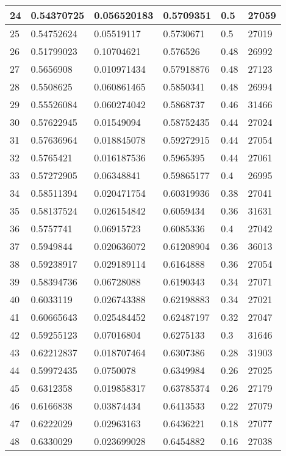 \begin{longtable}{|l|l|l|l|l|l|}
24 & 0.54370725 & 0.056520183 & 0.5709351 & 0.5 & 27059 \\ \hline 
25 & 0.54752624 & 0.05519117 & 0.5730671 & 0.5 & 27019 \\ \hline 
26 & 0.51799023 & 0.10704621 & 0.576526 & 0.48 & 26992 \\ \hline 
27 & 0.5656908 & 0.010971434 & 0.57918876 & 0.48 & 27123 \\ \hline 
28 & 0.5508625 & 0.060861465 & 0.5850341 & 0.48 & 26994 \\ \hline 
29 & 0.55526084 & 0.060274042 & 0.5868737 & 0.46 & 31466 \\ \hline 
30 & 0.57622945 & 0.01549094 & 0.58752435 & 0.44 & 27024 \\ \hline 
31 & 0.57636964 & 0.018845078 & 0.59272915 & 0.44 & 27054 \\ \hline 
32 & 0.5765421 & 0.016187536 & 0.5965395 & 0.44 & 27061 \\ \hline 
33 & 0.57272905 & 0.06348841 & 0.59865177 & 0.4 & 26995 \\ \hline 
34 & 0.58511394 & 0.020471754 & 0.60319936 & 0.38 & 27041 \\ \hline 
35 & 0.58137524 & 0.026154842 & 0.6059434 & 0.36 & 31631 \\ \hline 
36 & 0.5757741 & 0.06915723 & 0.6085336 & 0.4 & 27042 \\ \hline 
37 & 0.5949844 & 0.020636072 & 0.61208904 & 0.36 & 36013 \\ \hline 
38 & 0.59238917 & 0.029189114 & 0.6164888 & 0.36 & 27054 \\ \hline 
39 & 0.58394736 & 0.06728088 & 0.6190343 & 0.34 & 27071 \\ \hline 
40 & 0.6033119 & 0.026743388 & 0.62198883 & 0.34 & 27021 \\ \hline 
41 & 0.60665643 & 0.025484452 & 0.62487197 & 0.32 & 27047 \\ \hline 
42 & 0.59255123 & 0.07016804 & 0.6275133 & 0.3 & 31646 \\ \hline 
43 & 0.62212837 & 0.018707464 & 0.6307386 & 0.28 & 31903 \\ \hline 
44 & 0.59972435 & 0.0750078 & 0.6349984 & 0.26 & 27025 \\ \hline 
45 & 0.6312358 & 0.019858317 & 0.63785374 & 0.26 & 27179 \\ \hline 
46 & 0.6166838 & 0.03874434 & 0.6413533 & 0.22 & 27079 \\ \hline 
47 & 0.6222029 & 0.02963163 & 0.6436221 & 0.18 & 27077 \\ \hline 
48 & 0.6330029 & 0.023699028 & 0.6454882 & 0.16 & 27038 \\ \hline 

\end{longtable}
